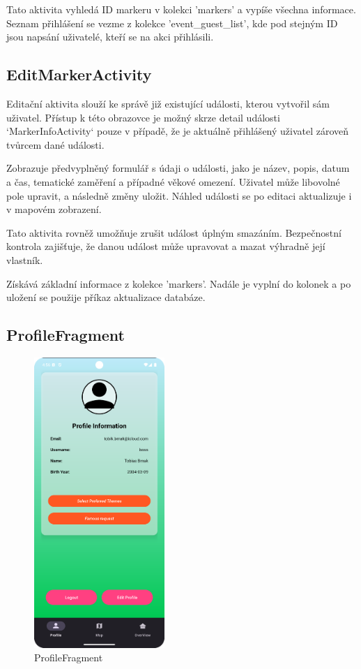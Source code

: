 Tato aktivita vyhledá ID markeru v kolekci 'markers' a vypíše všechna informace. Seznam přihlášení se vezme z kolekce 'event\_guest\_list', kde pod stejným ID jsou napsání uživatelé, kteří se na akci přihlásili.






\subsection*{EditMarkerActivity}

Editační aktivita slouží ke správě již existující události, kterou vytvořil sám uživatel. Přístup k této obrazovce je možný skrze detail události `MarkerInfoActivity` pouze v případě, že je aktuálně přihlášený uživatel zároveň tvůrcem dané události.

Zobrazuje předvyplněný formulář s údaji o události, jako je název, popis, datum a čas, tematické zaměření a případné věkové omezení. Uživatel může libovolné pole upravit, a následně změny uložit. Náhled události se po editaci aktualizuje i v mapovém zobrazení.

Tato aktivita rovněž umožňuje zrušit událost úplným smazáním. Bezpečnostní kontrola zajišťuje, že danou událost může upravovat a mazat výhradně její vlastník.

Získává základní informace z kolekce 'markers'. Nadále je vyplní do kolonek a po uložení se použije příkaz aktualizace databáze.





\subsection*{ProfileFragment}

\begin{figure}[H]
    \centering
    \includegraphics[height=11cm]{Images/Profile_frag.png}
    \caption{ProfileFragment}
    \label{fig:Update-account}
\end{figure}

